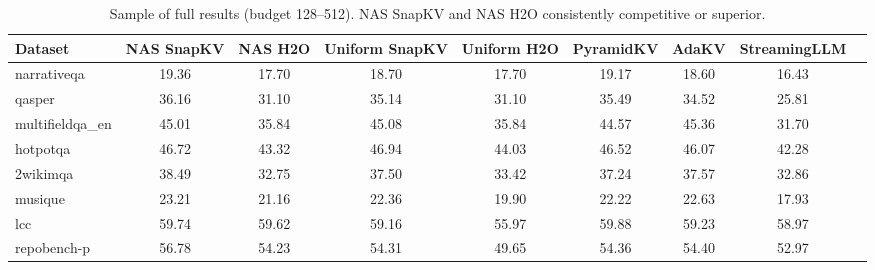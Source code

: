 \documentclass[11pt,a4paper]{article}
\begin{document}
\begin{table}[t]
\centering
\tiny
\begin{tabular}{l c c c c c c c c}
\toprule
\textbf{Dataset} & \textbf{NAS SnapKV} & \textbf{NAS H2O} & \textbf{Uniform SnapKV} & \textbf{Uniform H2O} & \textbf{PyramidKV} & \textbf{AdaKV} & \textbf{StreamingLLM} \\
\midrule
narrativeqa & 19.36 & 17.70 & 18.70 & 17.70 & 19.17 & 18.60 & 16.43 \\
qasper & 36.16 & 31.10 & 35.14 & 31.10 & 35.49 & 34.52 & 25.81 \\
multifieldqa\_en & 45.01 & 35.84 & 45.08 & 35.84 & 44.57 & 45.36 & 31.70 \\
hotpotqa & 46.72 & 43.32 & 46.94 & 44.03 & 46.52 & 46.07 & 42.28 \\
2wikimqa & 38.49 & 32.75 & 37.50 & 33.42 & 37.24 & 37.57 & 32.86 \\
musique & 23.21 & 21.16 & 22.36 & 19.90 & 22.22 & 22.63 & 17.93 \\
lcc & 59.74 & 59.62 & 59.16 & 55.97 & 59.88 & 59.23 & 58.97 \\
repobench-p & 56.78 & 54.23 & 54.31 & 49.65 & 54.36 & 54.40 & 52.97 \\
\bottomrule
\end{tabular}
\caption{Sample of full results (budget 128–512). NAS SnapKV and NAS H2O consistently competitive or superior.}
\label{tab:full-results}
\end{table}
\end{document}
